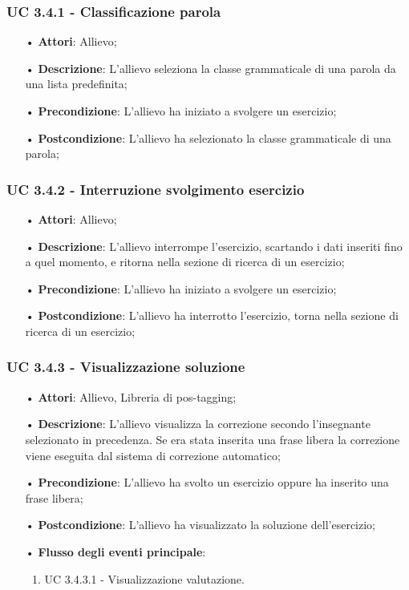 \subsubsection{UC 3.4.1 - Classificazione parola}
\begin{itemize}
\item[•]\textbf{Attori}: Allievo;
\item[•]\textbf{Descrizione}: L'allievo seleziona la classe grammaticale di una parola da una lista predefinita;
\item[•]\textbf{Precondizione}: L'allievo ha iniziato a svolgere un esercizio;
\item[•]\textbf{Postcondizione}: L'allievo ha selezionato la classe grammaticale di una parola;
\end{itemize}

\subsubsection{UC 3.4.2 - Interruzione svolgimento esercizio}
\begin{itemize}
\item[•]\textbf{Attori}: Allievo;
\item[•]\textbf{Descrizione}: L'allievo interrompe l'esercizio, scartando i dati inseriti fino a quel momento, e ritorna nella sezione di ricerca di un esercizio;
\item[•]\textbf{Precondizione}: L'allievo ha iniziato a svolgere un esercizio;
\item[•]\textbf{Postcondizione}: L'allievo ha interrotto l'esercizio, torna nella sezione di ricerca di un esercizio;
\end{itemize}

\subsubsection{UC 3.4.3 - Visualizzazione soluzione}
\begin{itemize}
\item[•]\textbf{Attori}: Allievo, Libreria di pos-tagging;
\item[•]\textbf{Descrizione}: L'allievo visualizza la correzione secondo l'insegnante selezionato in precedenza. Se era stata inserita una frase libera la correzione viene eseguita dal sistema di correzione automatico;
\item[•]\textbf{Precondizione}: L'allievo ha svolto un esercizio oppure ha inserito una frase libera;
\item[•]\textbf{Postcondizione}: L'allievo ha visualizzato la soluzione dell'esercizio;
\item[•]\textbf{Flusso degli eventi principale}:
\begin{enumerate}
\item UC 3.4.3.1 - Visualizzazione valutazione.
\end{enumerate}
\end{itemize}

